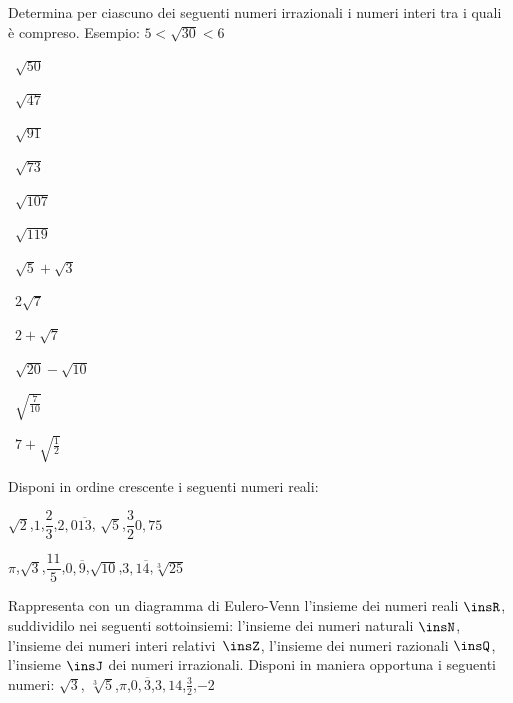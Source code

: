 \begin{esercizio}
\label{ese:1.4}
 Determina per ciascuno dei seguenti numeri irrazionali i numeri interi tra 
i quali è compreso. Esempio: \(5<\sqrt{30}<6\)
\begin{multicols}{4}
\begin{enumeratea}
 \item~\(\sqrt{50}\)
 \item~\(\sqrt{47}\)
 \item~\(\sqrt{91}\)
 \item~\(\sqrt{73}\)
 \item~\(\sqrt{107}\)
 \item~\(\sqrt{119}\)
 \item~\(\sqrt 5+\sqrt 3\)
 \item~\(2\sqrt 7\)
 \item~\(2+\sqrt 7\)
 \item~\(\sqrt{20}-\sqrt{10}\)
 \item~\(\sqrt{\frac 7{10}}\)
 \item~\(7+\sqrt{\frac 1 2}\)
\end{enumeratea}
\end{multicols}
\end{esercizio}

\begin{esercizio}
\label{ese:1.5}
 Disponi in ordine crescente i seguenti numeri reali:
 \begin{enumeratea}
 \item \(\sqrt 2\),\quad \(1\),\quad \(\dfrac 2 3\),\quad \(2,0\overline{13}\),\quad 
\(\sqrt 5\),\quad \(\dfrac 3 2\)\quad \(0,75\)
 \item \(\pi\),\quad \(\sqrt 3\),\quad \(\dfrac{11} 5\),\quad \(0,\overline 
9\),\quad \(\sqrt{10}\),\quad \(3,1\overline 4\),\quad \(\sqrt[3]{25}\)
 \end{enumeratea}
\end{esercizio}

\begin{esercizio}
\label{ese:1.6}
 Rappresenta con un diagramma di Eulero-Venn l'insieme dei numeri reali 
\(\insR\), suddividilo nei seguenti sottoinsiemi: l'insieme dei numeri 
naturali \(\insN\), l'insieme dei numeri interi relativi~\(\insZ\), l'insieme 
dei numeri razionali \(\insQ\), l'insieme \(\insJ\) dei numeri irrazionali. 
Disponi in maniera opportuna i seguenti numeri: \(\sqrt 3\),\quad 
\(\sqrt[3]5\),\quad\(\pi\),\quad \(0,\overline 3\),\quad \(3,14\),\quad \(\frac 3 
2\),\quad\(-2\)
\end{esercizio}

